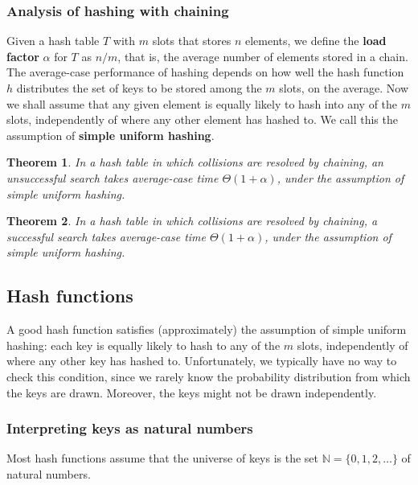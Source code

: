 \documentclass[12pt]{article}
\newtheorem{theorem}{Theorem}
\begin{document}
\subsubsection*{Analysis of hashing with chaining}

Given a hash table $T$ with $m$ slots that stores $n$ elements, we define the \textbf {load factor} $\alpha$ for $T$ as $n/m$, that is, the average number of elements stored in a chain. \\

The average-case performance of hashing depends on how well the hash function $h$ distributes the set of keys to be stored among the $m$ slots, on the average. Now we shall assume that any given element is equally likely to hash into any of the $m$ slots, independently of where any other element has hashed to. We call this the assumption of \textbf {simple uniform hashing}.

\begin{theorem}
  In a hash table in which collisions are resolved by chaining, an unsuccessful search takes average-case time $\Theta (1 + \alpha)$, under the assumption of simple uniform hashing.
\end{theorem}

\begin{theorem}
  In a hash table in which collisions are resolved by chaining, a successful search takes average-case time $\Theta (1 + \alpha)$, under the assumption of simple uniform hashing.
\end{theorem}

\subsection{Hash functions}

A good hash function satisfies (approximately) the assumption of simple uniform hashing: each key is equally likely to hash to any of the $m$ slots, independently of where any other key has hashed to. Unfortunately, we typically have no way to check this condition, since we rarely know the probability distribution from which the keys are drawn. Moreover, the keys might not be drawn independently.

\subsubsection*{Interpreting keys as natural numbers}

Most hash functions assume that the universe of keys is the set $\mathbb {N} = \{0,1,2,\dots \}$ of natural numbers.
\end{document}
